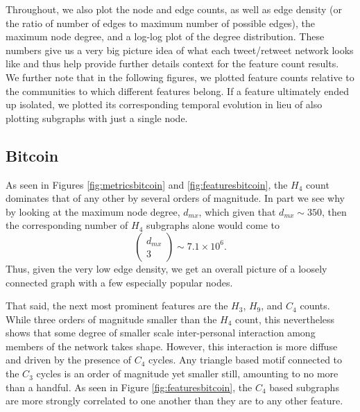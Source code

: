 \documentclass[a4paper,11pt]{article}
\begin{document}
Throughout, we also plot the node and edge counts, as well as edge density (or the ratio of number of edges to maximum number of possible edges), the maximum node degree, and a log-log plot of the degree distribution.  These numbers give us a very big picture idea of what each tweet/retweet network looks like and thus help provide further details context for the feature count results.  We further note that in the following figures, we plotted feature counts relative to the communities to which different features belong.  If a feature ultimately ended up isolated, we plotted its corresponding temporal evolution in lieu of also plotting subgraphs with just a single node.    
\subsection{Bitcoin}
As seen in Figures \ref{fig:metricsbitcoin} and \ref{fig:featuresbitcoin}, the $H_{4}$ count dominates that of any other by several orders of magnitude.  In part we see why by looking at the maximum node degree, $d_{mx}$, which given that $d_{mx}\sim 350$, then the corresponding number of $H_{4}$ subgraphs alone would come to 
\[
\begin{pmatrix} d_{mx} \\ 3 \end{pmatrix} \sim 7.1 \times 10^{6}.
\]
Thus, given the very low edge density, we get an overall picture of a loosely connected graph with a few especially popular nodes.  

That said, the next most prominent features are the $H_{3}$, $H_{9}$, and $C_{4}$ counts.  While three orders of magnitude smaller than the $H_{4}$ count, this nevertheless shows that some degree of smaller scale inter-personal interaction among members of the network takes shape.  However, this interaction is more diffuse and driven by the presence of $C_{4}$ cycles.  Any triangle based motif connected to the $C_{3}$ cycles is an order of magnitude yet smaller still, amounting to no more than a handful.  As seen in Figure \ref{fig:featuresbitcoin}, the $C_{4}$ based subgraphs are more strongly correlated to one another than they are to any other feature.   
\end{document}
